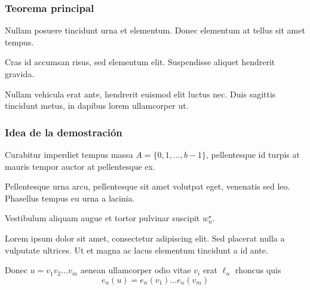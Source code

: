 \documentclass[t, 10pt, mathserif]{beamer}
\begin{document}

\begin{frame}
  \frametitle{Teorema principal}

  Nullam posuere tincidunt urna et elementum. Donec elementum at tellus sit amet tempus.
  \pause

  \medskip
  \begin{problem}
    Cras id accumsan risus, sed elementum elit. Suspendisse aliquet hendrerit gravida.
  \end{problem}
  \pause

  \medskip
  \begin{theorem}
    Nullam vehicula erat ante, hendrerit euismod elit luctus nec. Duis sagittis tincidunt metus, in dapibus lorem ullamcorper ut.
  \end{theorem}
\end{frame}


\begin{frame}
  \frametitle{Idea de la demostración}

  \medskip
  \begin{definition}
    Curabitur imperdiet tempus massa $A=\{0,1, \ldots, b-1\}$, pellentesque id turpis at mauris tempor auctor at pellentesque ex.
    \pause

    Pellentesque urna arcu, pellentesque sit amet volutpat eget, venenatis sed leo. Phasellus tempus eu urna a lacinia.
    \pause

    Vestibulum aliquam augue et tortor pulvinar suscipit $w^{\star}_n$.
    \pause

    Lorem ipsum dolor sit amet, consectetur adipiscing elit. Sed placerat nulla a vulputate ultrices. Ut et magna ac lacus elementum tincidunt a id ante.

    {\color{magenta}
      Donec $u=v_1 v_2 \ldots v_m$ aenean ullamcorper odio vitae $v_i$ erat $\ell_n$  rhoncus quis
      \[
      e_n(u)=e_n(v_1)\ldots e_n(v_m)
      \]
    }
  \end{definition}
\end{frame}

\end{document}
